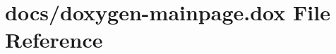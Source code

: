 \hypertarget{doxygen-mainpage_8dox}{\section{docs/doxygen-\/mainpage.dox File Reference}
\label{doxygen-mainpage_8dox}
}
